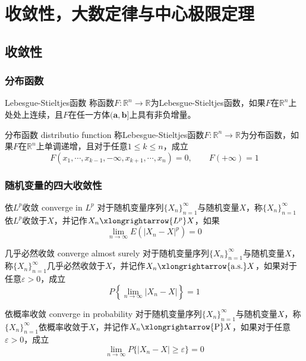 \documentclass[lang = cn, scheme = chinese, thmcnt = section]{elegantbook}
\newcommand{\R}{\mathbb{R}}            %
\newcommand{\bs}{\boldsymbol}          %
\newcommand{\toP}{\xlongrightarrow{\mathrm{P}}}
\newcommand{\toas}{\xlongrightarrow{\mathrm{a.s.}}}
\newcommand{\toLp}{\xlongrightarrow{L^p}}
\begin{document}
\appendix

\chapter{收敛性，大数定律与中心极限定理}

\section{收敛性}

\subsection{分布函数}

\begin{definition}{Lebesgue-Stieltjes函数}
	称函数$F:\R^n\to\R$为Lebesgue-Stieltjes函数，如果$F$在$\R^n$上处处上连续，且$F$在任一方体$(\bs{a},\bs{b}]$上具有非负增量。
\end{definition}

\begin{definition}{分布函数 distributio function}
	称Lebesgue-Stieltjes函数$F:\R^n\to\R$为分布函数，如果$F$在$\R^n$上单调递增，且对于任意$1\le k \le n$，成立%
	$$
	F(x_1,\cdots,x_{k-1},-\infty,x_{k+1},\cdots,x_n)=0,\qquad
	F(\bs{+\infty})=1
	$$
\end{definition}

\subsection{随机变量的四大收敛性}

\begin{definition}{依$L^p$收敛 converge in $L^p$}
	对于随机变量序列$\{ X_n \}_{n=1}^{\infty}$与随机变量$X$，称$\{ X_n \}_{n=1}^{\infty}$依$L^p$收敛于$X$，并记作$X_n\toLp X$，如果
	$$
	\lim_{n\to\infty}E(|X_n-X|^p)=0
	$$
\end{definition}

\begin{definition}{几乎必然收敛 converge almost surely}
	对于随机变量序列$\{ X_n \}_{n=1}^{\infty}$与随机变量$X$，称$\{ X_n \}_{n=1}^{\infty}$几乎必然收敛于$X$，并记作$X_n\toas X$，如果对于任意$\varepsilon>0$，成立%
	$$
	P\left\{ \lim_{n\to\infty}|X_n-X| \right\}=1
	$$
\end{definition}

\begin{definition}{依概率收敛 converge in probability}
	对于随机变量序列$\{ X_n \}_{n=1}^{\infty}$与随机变量$X$，称$\{ X_n \}_{n=1}^{\infty}$依概率收敛于$X$，并记作$X_n\toP X$，如果对于任意$\varepsilon>0$，成立%
	$$
	\lim_{n\to\infty}P\{ |X_n-X|\ge \varepsilon \}=0
	$$
\end{definition}
\end{document}
